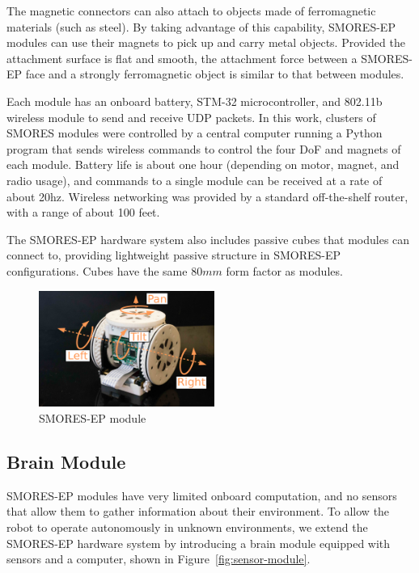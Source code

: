 \documentclass[conference]{IEEEtran}
\begin{document}
The magnetic connectors can also attach to objects made of ferromagnetic
materials (such as steel).  By taking advantage of this capability, SMORES-EP
modules can use their magnets to pick up and carry metal objects.
Provided the attachment surface is flat and smooth, the attachment force
between a SMORES-EP face and a strongly ferromagnetic object is similar to that between modules.

Each module has an onboard battery, STM-32 microcontroller, and 802.11b wireless
module to send and receive UDP packets.  In this work, clusters of SMORES
modules were controlled by a central computer running a Python program that
sends wireless commands to control the four DoF and magnets of each module.
Battery life is about one hour (depending on motor, magnet, and radio usage),
and commands to a single module can be received at a rate of about 20hz.
Wireless networking was provided by a standard off-the-shelf  router, with a
range of about 100 feet.

The SMORES-EP hardware system also includes passive cubes that modules can connect to, providing lightweight passive structure in SMORES-EP configurations.  Cubes have the same $80mm$ form factor as modules.
%
\begin{figure}   
\begin{center}
\includegraphics[height=1.5in]{images/smores_dof.pdf}
\end{center}
\caption{SMORES-EP module}
\label{fig:smores-module}
\end{figure}
%

\subsection{Brain Module} %
\label{sec:sensor_module}
%
SMORES-EP modules have very limited onboard computation, and no sensors that allow them to gather information about their environment.  To allow the robot to operate autonomously in unknown environments, we extend the SMORES-EP hardware system by introducing a brain module equipped with sensors and a computer, shown in Figure~\ref{fig:sensor-module}.
\end{document}

